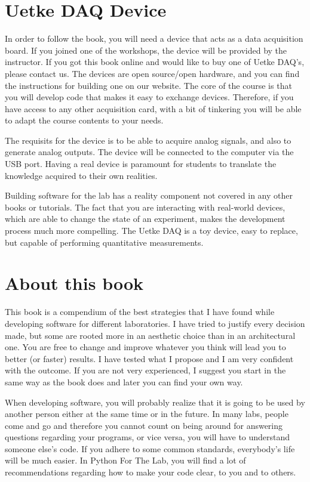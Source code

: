 \section{Uetke DAQ Device}
In order to follow the book, you will need a device that acts as a data acquisition board. If you joined one of the workshops, the device will be provided by the instructor. If you got this book online and would like to buy one of Uetke DAQ's, please contact us. The devices are open source/open hardware, and you can find the instructions for building one on our website. The core of the course is that you will develop code that makes it easy to exchange devices. Therefore, if you have access to any other acquisition card, with a bit of tinkering you will be able to adapt the course contents to your needs. 

The requisits for the device is to be able to acquire analog signals, and also to generate analog outputs. The device will be connected to the computer via the USB port. Having a real device is paramount for students to translate the knowledge acquired to their own realities. 

Building software for the lab has a reality component not covered in any other books or tutorials. The fact that you are interacting with real-world devices, which are able to change the state of an experiment, makes the development process much more compelling. The Uetke DAQ is a toy device, easy to replace, but capable of performing quantitative measurements. 

\section{About this book}
This book is a compendium of the best strategies that I have found while developing software for different laboratories. I have tried to justify every decision made, but some are rooted more in an aesthetic choice than in an architectural one. You are free to change and improve whatever you think will lead you to better (or faster) results. I have tested what I propose and I am very confident with the outcome. If you are not very experienced, I suggest you start in the same way as the book does and later you can find your own way.

When developing software, you will probably realize that it is going to be used by another person either at the same time or in the future. In many labs, people come and go and therefore you cannot count on being around for answering questions regarding your programs, or vice versa, you will have to understand someone else’s code. If you adhere to some common standards, everybody’s life will be much easier. In Python For The Lab, you will find a lot of recommendations regarding how to make your code clear, to you and to others.

